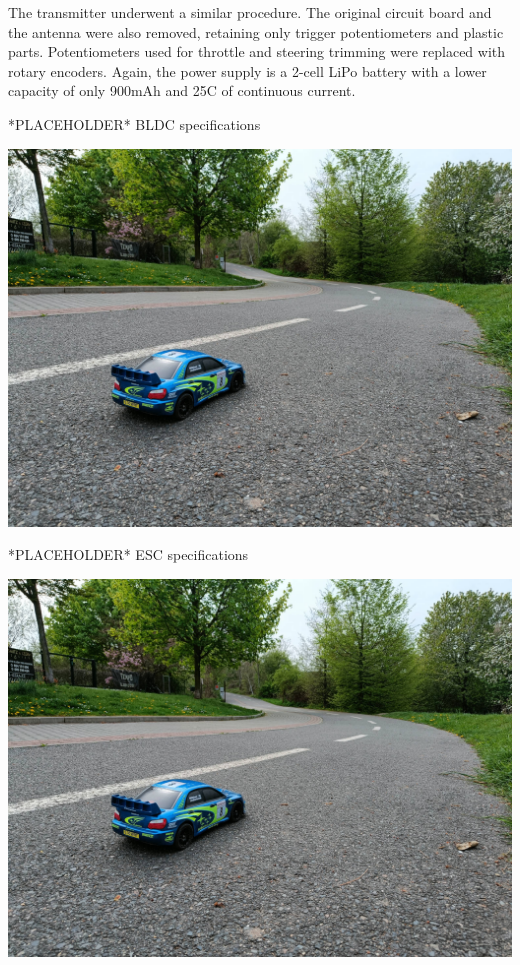 The transmitter underwent a similar procedure. The original circuit board and the antenna were also removed, retaining only trigger potentiometers and plastic parts. Potentiometers used for throttle and steering trimming were replaced with rotary encoders. Again, the power supply is a 2-cell LiPo battery with a lower capacity of only 900mAh and 25C of continuous current.


\begin{table}[t]
\caption{*PLACEHOLDER* BLDC specifications} %
\includegraphics[width=0.8\linewidth]{images/placeholder}
\label{tab:BLDC_spec}
\end{table}

\begin{table}[t]
\caption{*PLACEHOLDER* ESC specifications} %
\includegraphics[width=0.8\linewidth]{images/placeholder}
\label{tab:ESC_spec}
\end{table}
